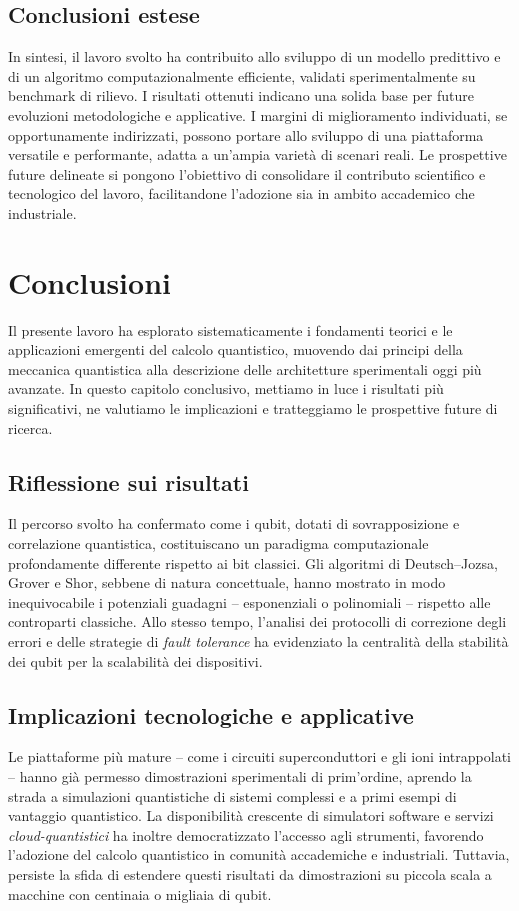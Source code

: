 \documentclass[a4paper,12pt]{report}
\theoremstyle{plain}
\begin{document}
\section{Conclusioni estese}
In sintesi, il lavoro svolto ha contribuito allo sviluppo di un modello predittivo e di un algoritmo computazionalmente efficiente, validati sperimentalmente su benchmark di rilievo. I risultati ottenuti indicano una solida base per future evoluzioni metodologiche e applicative.
I margini di miglioramento individuati, se opportunamente indirizzati, possono portare allo sviluppo di una piattaforma versatile e performante, adatta a un'ampia varietà di scenari reali. Le prospettive future delineate si pongono l'obiettivo di consolidare il contributo scientifico e tecnologico del lavoro, facilitandone l'adozione sia in ambito accademico che industriale.


\chapter{Conclusioni}

Il presente lavoro ha esplorato sistematicamente i fondamenti teorici e le applicazioni emergenti del calcolo quantistico, muovendo dai principi della meccanica quantistica alla descrizione delle architetture sperimentali oggi più avanzate. In questo capitolo conclusivo, mettiamo in luce i risultati più significativi, ne valutiamo le implicazioni e tratteggiamo le prospettive future di ricerca.

\section*{Riflessione sui risultati}
Il percorso svolto ha confermato come i qubit, dotati di sovrapposizione e correlazione quantistica, costituiscano un paradigma computazionale profondamente differente rispetto ai bit classici. Gli algoritmi di Deutsch--Jozsa, Grover e Shor, sebbene di natura concettuale, hanno mostrato in modo inequivocabile i potenziali guadagni -- esponenziali o polinomiali -- rispetto alle controparti classiche. Allo stesso tempo, l'analisi dei protocolli di correzione degli errori e delle strategie di \emph{fault tolerance} ha evidenziato la centralità della stabilità dei qubit per la scalabilità dei dispositivi.

\section*{Implicazioni tecnologiche e applicative}
Le piattaforme più mature -- come i circuiti superconduttori e gli ioni intrappolati -- hanno già permesso dimostrazioni sperimentali di prim'ordine, aprendo la strada a simulazioni quantistiche di sistemi complessi e a primi esempi di vantaggio quantistico. La disponibilità crescente di simulatori software e servizi \emph{cloud-quantistici} ha inoltre democratizzato l'accesso agli strumenti, favorendo l'adozione del calcolo quantistico in comunità accademiche e industriali. Tuttavia, persiste la sfida di estendere questi risultati da dimostrazioni su piccola scala a macchine con centinaia o migliaia di qubit.
\end{document}

